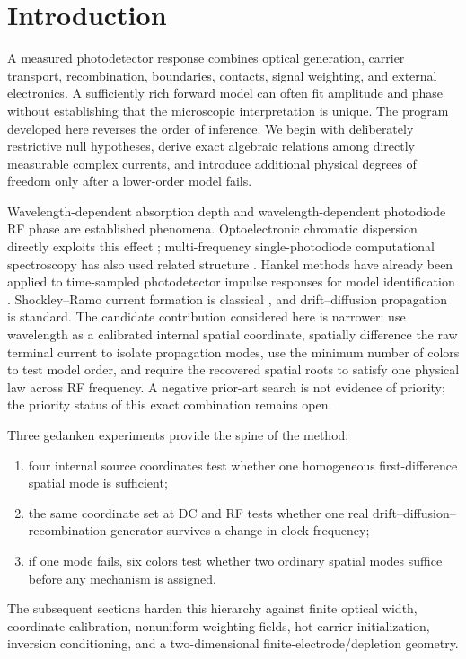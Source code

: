\documentclass[11pt]{article}
\begin{document}
\section{Introduction}
A measured photodetector response combines optical generation, carrier transport, recombination, boundaries, contacts, signal weighting, and external electronics. A sufficiently rich forward model can often fit amplitude and phase without establishing that the microscopic interpretation is unique. The program developed here reverses the order of inference. We begin with deliberately restrictive null hypotheses, derive exact algebraic relations among directly measurable complex currents, and introduce additional physical degrees of freedom only after a lower-order model fails.

Wavelength-dependent absorption depth and wavelength-dependent photodiode RF phase are established phenomena. Optoelectronic chromatic dispersion directly exploits this effect \cite{Glasser2021}; multi-frequency single-photodiode computational spectroscopy has also used related structure \cite{Kassa2026}. Hankel methods have already been applied to time-sampled photodetector impulse responses for model identification \cite{Sun2025}. Shockley--Ramo current formation is classical \cite{Shockley1938,Ramo1939,Dabrowski1989}, and drift--diffusion propagation is standard. The candidate contribution considered here is narrower: use wavelength as a calibrated internal spatial coordinate, spatially difference the raw terminal current to isolate propagation modes, use the minimum number of colors to test model order, and require the recovered spatial roots to satisfy one physical law across RF frequency. A negative prior-art search is not evidence of priority; the priority status of this exact combination remains open.

Three gedanken experiments provide the spine of the method:
\begin{enumerate}[label=(\roman*)]
\item four internal source coordinates test whether one homogeneous first-difference spatial mode is sufficient;
\item the same coordinate set at DC and RF tests whether one real drift--diffusion--recombination generator survives a change in clock frequency;
\item if one mode fails, six colors test whether two ordinary spatial modes suffice before any mechanism is assigned.
\end{enumerate}
The subsequent sections harden this hierarchy against finite optical width, coordinate calibration, nonuniform weighting fields, hot-carrier initialization, inversion conditioning, and a two-dimensional finite-electrode/depletion geometry.
\end{document}
